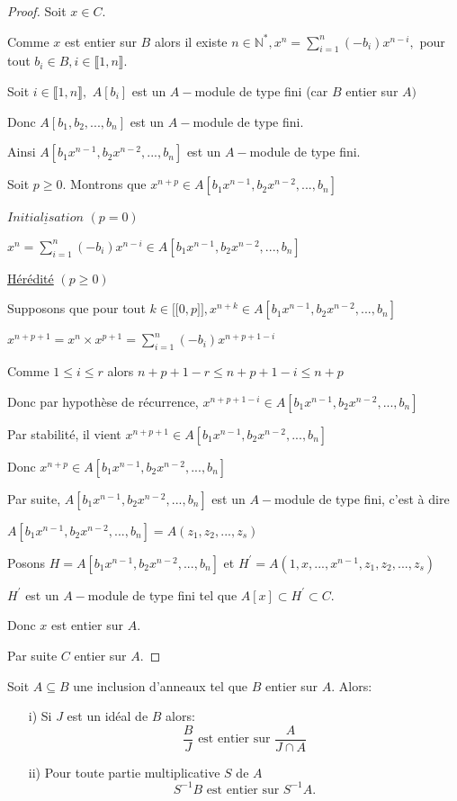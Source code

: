 \begin{proof}
	Soit $x\in C.$
	
	Comme $x$ est entier sur $B$ alors il existe $n\in \mathbb{N}^{\ast },x^{n}=\sum\limits_{i=1}^{n}(-b_{i})x^{n-i},$ pour tout $b_{i}\in
	B,i\in \llbracket 1, n \rrbracket.$
	
	Soit $i\in \llbracket 1, n \rrbracket,$ $A[b_{i}]$ est un $A-$module de type fini
	(car $B$ entier sur $A)$
	
	Donc $A[b_{1},b_{2},...,b_{n}]$ est un $A-$module de type fini.
	
	Ainsi $A[b_{1}x^{n-1},b_{2}x^{n-2},...,b_{n}]$ est un $A-$module de type
	fini.
	
	Soit $p\geq 0.$ Montrons que $x^{n+p}\in
	A[b_{1}x^{n-1},b_{2}x^{n-2},...,b_{n}]$
	
	$\underline{Initialisation}$ $(p=0)$
	
	$x^{n}=\sum\limits_{i=1}^{n}(-b_{i})x^{n-i}\in
	A[b_{1}x^{n-1},b_{2}x^{n-2},...,b_{n}]$
	
	\underline{Hérédité} $(p\geq 0)$
	
	Supposons que pour tout $k\in \lbrack \lbrack 0,p]],x^{n+k}\in
	A[b_{1}x^{n-1},b_{2}x^{n-2},...,b_{n}]$
	
	$x^{n+p+1}=x^{n}\times x^{p+1}=\sum\limits_{i=1}^{n}(-b_{i})x^{n+p+1-i}$
	
	Comme $1\leq i\leq r$ alors $n+p+1-r\leq n+p+1-i\leq n+p$
	
	Donc par hypothèse de récurrence, $x^{n+p+1-i}\in
	A[b_{1}x^{n-1},b_{2}x^{n-2},...,b_{n}]$
	
	Par stabilité, il vient $x^{n+p+1}\in
	A[b_{1}x^{n-1},b_{2}x^{n-2},...,b_{n}]$
	
	Donc $x^{n+p}\in A[b_{1}x^{n-1},b_{2}x^{n-2},...,b_{n}]$
	
	Par suite, $A[b_{1}x^{n-1},b_{2}x^{n-2},...,b_{n}]$ est un $A-$module de
	type fini, c'est à dire 
	
	$A[b_{1}x^{n-1},b_{2}x^{n-2},...,b_{n}]=A(z_{1},z_{2},...,z_{s})$
	
	Posons $H=A[b_{1}x^{n-1},b_{2}x^{n-2},...,b_{n}]$ et $H^{\prime
	}=A(1,x,...,x^{n-1},z_{1},z_{2},...,z_{s})$
	
	$H^{\prime }$ est un $A-$module de type fini tel que $A[x]\subset H^{\prime
	}\subset C.$
	
	Donc $x$ est entier sur $A.$
	
	Par suite $C$ entier sur $A.$
\end{proof}
\begin{maproposition}
	Soit $A \subseteq B$ une inclusion d'anneaux tel que $B$ entier sur $A$. Alors:\\
	\begin{enumerate}
		\item[i)] Si $J$ est un idéal de $B$ alors:
		\[ \dfrac{B}{J} \text{ est entier sur } \dfrac{A}{J \cap A}\]
		\item[ii)] Pour toute partie multiplicative $S$ de $A$
		\[ S^{-1}B \text{ est entier sur } S^{-1}A.\]
	\end{enumerate}
\end{maproposition}
